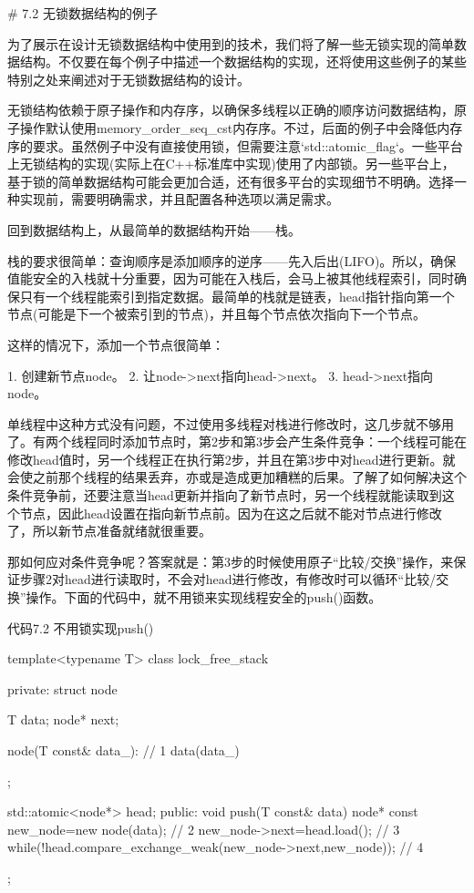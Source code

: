 # 7.2 无锁数据结构的例子

为了展示在设计无锁数据结构中使用到的技术，我们将了解一些无锁实现的简单数据结构。不仅要在每个例子中描述一个数据结构的实现，还将使用这些例子的某些特别之处来阐述对于无锁数据结构的设计。

无锁结构依赖于原子操作和内存序，以确保多线程以正确的顺序访问数据结构，原子操作默认使用memory\_order\_seq\_cst内存序。不过，后面的例子中会降低内存序的要求。虽然例子中没有直接使用锁，但需要注意`std::atomic\_flag`。一些平台上无锁结构的实现(实际上在C++标准库中实现)使用了内部锁。另一些平台上，基于锁的简单数据结构可能会更加合适，还有很多平台的实现细节不明确。选择一种实现前，需要明确需求，并且配置各种选项以满足需求。

回到数据结构上，从最简单的数据结构开始——栈。


栈的要求很简单：查询顺序是添加顺序的逆序——先入后出(LIFO)。所以，确保值能安全的入栈就十分重要，因为可能在入栈后，会马上被其他线程索引，同时确保只有一个线程能索引到指定数据。最简单的栈就是链表，head指针指向第一个节点(可能是下一个被索引到的节点)，并且每个节点依次指向下一个节点。

这样的情况下，添加一个节点很简单：

1. 创建新节点node。
2. 让node->next指向head->next。
3. head->next指向node。

单线程中这种方式没有问题，不过使用多线程对栈进行修改时，这几步就不够用了。有两个线程同时添加节点时，第2步和第3步会产生条件竞争：一个线程可能在修改head值时，另一个线程正在执行第2步，并且在第3步中对head进行更新。就会使之前那个线程的结果丢弃，亦或是造成更加糟糕的后果。了解了如何解决这个条件竞争前，还要注意当head更新并指向了新节点时，另一个线程就能读取到这个节点，因此head设置在指向新节点前。因为在这之后就不能对节点进行修改了，所以新节点准备就绪就很重要。

那如何应对条件竞争呢？答案就是：第3步的时候使用原子“比较/交换”操作，来保证步骤2对head进行读取时，不会对head进行修改，有修改时可以循环“比较/交换”操作。下面的代码中，就不用锁来实现线程安全的push()函数。

代码7.2 不用锁实现push()

\begin{cpp}
template<typename T>
class lock_free_stack
{
private:
  struct node
  {
    T data;
    node* next;

    node(T const& data_):  // 1
     data(data_)
    {}
  };

  std::atomic<node*> head;
public:
  void push(T const& data)
  {
    node* const new_node=new node(data); // 2
    new_node->next=head.load();  // 3
    while(!head.compare_exchange_weak(new_node->next,new_node));  // 4
  }
};
\end{cpp}

